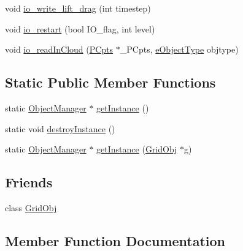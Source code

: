 \begin{DoxyCompactItemize}
\item 
void \hyperlink{class_object_manager_ab46e89c9eaf8ca1c9ec264545f39cd7f}{io\+\_\+write\+\_\+lift\+\_\+drag} (int timestep)
\item 
void \hyperlink{class_object_manager_aaa1b7e2a3392c2a8d85606041b986b4d}{io\+\_\+restart} (bool I\+O\+\_\+flag, int level)
\item 
void \hyperlink{class_object_manager_a5c11d747c3df9e91d5fc2dac836d7b7e}{io\+\_\+read\+In\+Cloud} (\hyperlink{class_p_cpts}{P\+Cpts} $\ast$\+\_\+\+P\+Cpts, \hyperlink{_object_manager_8h_a7b78fa3db30dfb9c1efc82bf886fe184}{e\+Object\+Type} objtype)
\end{DoxyCompactItemize}
\subsection*{Static Public Member Functions}
\begin{DoxyCompactItemize}
\item 
static \hyperlink{class_object_manager}{Object\+Manager} $\ast$ \hyperlink{class_object_manager_acf7a2f12f034c76d9e3a5aa5837dddb5}{get\+Instance} ()
\item 
static void \hyperlink{class_object_manager_a5945decc43eb5fdeaaad101fa7aa282f}{destroy\+Instance} ()
\item 
static \hyperlink{class_object_manager}{Object\+Manager} $\ast$ \hyperlink{class_object_manager_a3c648f3d7388df47db0db9fcb4b8b618}{get\+Instance} (\hyperlink{class_grid_obj}{Grid\+Obj} $\ast$g)
\end{DoxyCompactItemize}
\subsection*{Friends}
\begin{DoxyCompactItemize}
\item 
class \hyperlink{class_object_manager_a55cfec1721fb1b9d9e7592bd6288c998}{Grid\+Obj}
\end{DoxyCompactItemize}


\subsection{Member Function Documentation}
